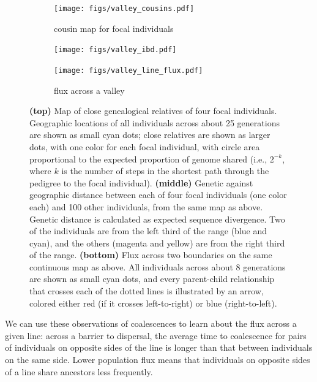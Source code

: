 \documentclass{ar-1col}
\newcommand{\todo}[1]{{\textbf{\color{red}{#1}}}}
\begin{document}
\begin{figure}[ht]
    \centering
    \begin{subfigure}{\textwidth}
        \centering
        \texttt{[image: figs/valley\_cousins.pdf]}
        \caption{cousin map for focal individuals}
        \label{cousin_map}
    \end{subfigure}
    \begin{subfigure}{\textwidth}
        \centering
        \texttt{[image: figs/valley\_ibd.pdf]}
        \caption{\todo{ibd map for 4 individuals}}
        \label{ibd}
    \end{subfigure}
    \begin{subfigure}{\textwidth}
        \centering
        \texttt{[image: figs/valley\_line\_flux.pdf]}
        \caption{flux across a valley}
        \label{valleyflux}
    \end{subfigure}
        \caption{
            \textbf{(top)} Map of close genealogical relatives of four focal individuals.
            Geographic locations of all individuals across about 25 generations are shown as small cyan dots;
            close relatives are shown as larger dots, with one color for each focal individual,
            with circle area proportional to the expected proportion of genome shared
            (i.e., $2^{-k}$, where $k$ is the number of steps in the shortest path through the pedigree to the focal individual).
            \textbf{(middle)}
            Genetic against geographic distance between each of four focal individuals (one color each)
            and 100 other individuals, from the same map as above.
            Genetic distance is calculated as expected sequence divergence.
            Two of the individuals are from the left third of the range (blue and cyan),
            and the others (magenta and yellow) are from the right third of the range.
            \textbf{(bottom)}
            Flux across two boundaries on the same continuous map as above.
            All individuals across about 8 generations are shown as small cyan dots,
            and every parent-child relationship that crosses each of the dotted lines
            is illustrated by an arrow, colored either red (if it crosses left-to-right) or blue (right-to-left).
        }
        \label{fig:dispersal}
\end{figure}

We can use these observations of coalescences to learn about the flux across a given line:
across a barrier to dispersal,
the average time to coalescence for pairs of individuals on opposite sides of the line
is longer than that between individuals on the same side.
Lower population flux means that individuals on opposite sides of a line share ancestors
less frequently.
\end{document}
